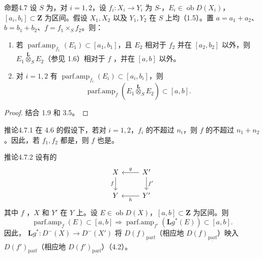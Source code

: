\begin{SGAresult}{命题}{4.7}
设 $S$ 为，对 $i=1,2$，设 $f_i:X_i\to Y_i$ 为 $S$-，$E_i\in\operatorname{ob}D(X_i)$，$[a_i,b_i]\subset\mathbf Z$ 为区间。假设 $X_1,X_2$ 以及 $Y_1,Y_2$ 在 $S$ 上均（1.5）。置 $a=a_1+a_2$、$b=b_1+b_2$、$f=f_1\times_Sf_2$。则：
\begin{enumerate}
\item[a)] 若 $\operatorname{parf.amp}_{f_1}(E_1)\subset[a_1,b_1]$，且 $E_2$ 相对于 $f_2$ 并在 $[a_2,b_2]$ 以外，则 $E_1\mathbin{\overset{\mathbf L}{\otimes}}_SE_2$（参见 1.6）相对于 $f$ ，并在 $[a,b]$ 以外。
\item[b)] 对 $i=1,2$ 有 $\operatorname{parf.amp}_{f_i}(E_i)\subset[a_i,b_i]$，则
\[
\operatorname{parf.amp}_f(E_1\mathbin{\overset{\mathbf L}{\otimes}}_SE_2)\subset[a,b].
\]
\end{enumerate}
\end{SGAresult}
\begin{proof}结合 1.9 和 3.5。
\end{proof}
\begin{SGAresult}{推论}{4.7.1}
在 4.6 的假设下，若对 $i=1,2$，$f_i$ 的不超过 $n_i$，则 $f$ 的不超过 $n_1+n_2$。因此，若 $f_1,f_2$ 都是，则 $f$ 也是。
\end{SGAresult}
\begin{SGAresult}{推论}{4.7.2}
设有的
\[
\begin{tikzcd}
X\arrow[d,"f"']&X'\arrow[l,"g"']\arrow[d,"f'"]\\
Y&Y'\arrow[l,"h"]
\end{tikzcd}
\]
其中 $f$ ，$X$ 和 $Y'$ 在 $Y$ 上。设 $E\in\operatorname{ob}D(X)$，$[a,b]\subset\mathbf Z$ 为区间。则
\[
\operatorname{parf.amp}_f(E)\subset[a,b]\Longrightarrow
\operatorname{parf.amp}_{f'}(\mathbf Lg^*(E))\subset[a,b].
\]
因此， $\mathbf Lg^*:D^-(X)\to D^-(X')$ 将 $D(f)_{\mathrm{parf}}$（相应地 $D(f)_{\underline{\mathrm{parf}}}$）映入 $D(f')_{\mathrm{parf}}$（相应地 $D(f')_{\underline{\mathrm{parf}}}$）（4.2）。
\end{SGAresult}

